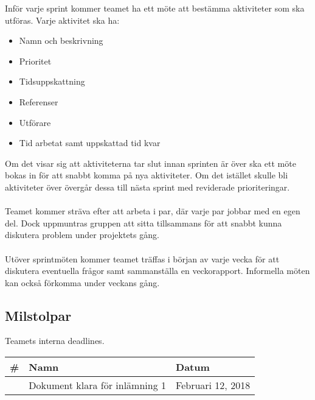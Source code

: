 Inför varje sprint kommer teamet ha ett möte att bestämma aktiviteter som ska utföras. Varje aktivitet ska ha: \begin{itemize}
    \item Namn och beskrivning
    \item Prioritet
    \item Tidsuppskattning
    \item Referenser
    \item Utförare
    \item Tid arbetat samt uppskattad tid kvar
\end{itemize}
Om det visar sig att aktiviteterna tar slut innan sprinten är över ska ett möte bokas in för att snabbt komma på nya aktiviteter. Om det istället skulle bli aktiviteter över övergår dessa till nästa sprint med reviderade prioriteringar.\\
\\
Teamet kommer sträva efter att arbeta i par, där varje par jobbar med en egen del. Dock uppmuntras
gruppen att sitta tillsammans för att snabbt kunna diskutera problem under projektets gång.\\
\\
Utöver sprintmöten kommer teamet träffas i början av varje vecka för att diskutera eventuella frågor samt sammanställa en veckorapport. Informella möten kan också förkomma under veckans gång.

\subsection{Milstolpar}
Teamets interna deadlines.

\begin{center}
    \begin{tabular}{| l | l | l | }
        \hline
        \textbf{\#} & \textbf{Namn} & \textbf{Datum} \\
        \hline
        \centering 1 & Dokument klara för inlämning 1 & Februari 12, 2018\\
        \hline
    \end{tabular}
\end{center}

